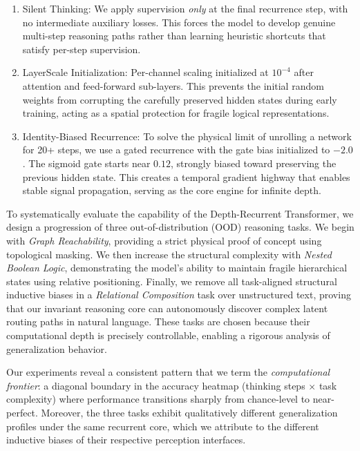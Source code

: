 \begin{enumerate}
    \item Silent Thinking: We apply supervision \emph{only} at the final recurrence step, with no intermediate auxiliary losses. This forces the model to develop genuine multi-step reasoning paths rather than learning heuristic shortcuts that satisfy per-step supervision.
 
    \item LayerScale Initialization: Per-channel scaling initialized at $10^{-4}$ after attention and feed-forward sub-layers. This prevents the initial random weights from corrupting the carefully preserved hidden states during early training, acting as a spatial protection for fragile logical representations.

    \item Identity-Biased Recurrence: To solve the physical limit of unrolling a network for 20+ steps, we use a gated recurrence with the gate bias initialized to $-2.0$. The sigmoid gate starts near $0.12$, strongly biased toward preserving the previous hidden state. This creates a temporal gradient highway that enables stable signal propagation, serving as the core engine for infinite depth.
\end{enumerate}
 
To systematically evaluate the capability of the Depth-Recurrent Transformer, we design a progression of three out-of-distribution (OOD) reasoning tasks. We begin with \emph{Graph Reachability}, providing a strict physical proof of concept using topological masking. We then increase the structural complexity with \emph{Nested Boolean Logic}, demonstrating the model's ability to maintain fragile hierarchical states using relative positioning. Finally, we remove all task-aligned structural inductive biases in a \emph{Relational Composition} task over unstructured text, proving that our invariant reasoning core can autonomously discover complex latent routing paths in natural language. These tasks are chosen because their computational depth is precisely controllable, enabling a rigorous analysis of generalization behavior.
 
Our experiments reveal a consistent pattern that we term the \emph{computational frontier}: a diagonal boundary in the accuracy heatmap (thinking steps $\times$ task complexity) where performance transitions sharply from chance-level to near-perfect. Moreover, the three tasks exhibit qualitatively different generalization profiles under the same recurrent core, which we attribute to the different inductive biases of their respective perception interfaces.
 
